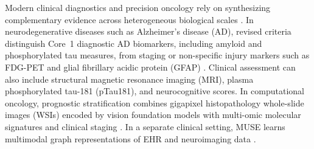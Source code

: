 \documentclass[10pt,twocolumn]{article}
\begin{document}
Modern clinical diagnostics and precision oncology rely on synthesizing complementary evidence
across heterogeneous biological scales \cite{baltrusaitis2018multimodal,acosta2022multimodal}.
In neurodegenerative diseases such as Alzheimer's disease (AD), revised criteria distinguish
Core~1 diagnostic AD biomarkers, including amyloid and phosphorylated tau measures, from
staging or non-specific injury markers such as FDG-PET and glial fibrillary acidic protein
(GFAP) \cite{jack2024revised,palmqvist2020discriminative,janelidze2020plasma}. Clinical
assessment can also include structural magnetic resonance imaging (MRI), plasma phosphorylated
tau-181 (pTau181), and neurocognitive scores. In computational oncology, prognostic
stratification combines gigapixel histopathology whole-slide images (WSIs) encoded by vision
foundation models \cite{chen2024uni,lu2024visual,filiot2023scaling,filiot2024phikonv2,%
kaiko2024towards,wang2022transformer,huang2023visual} with multi-omic molecular signatures and
clinical staging \cite{kather2019predicting,jaume2024survpath}. In a separate clinical setting,
MUSE learns multimodal graph representations of EHR and neuroimaging data \cite{wu2024muse}.
\end{document}
